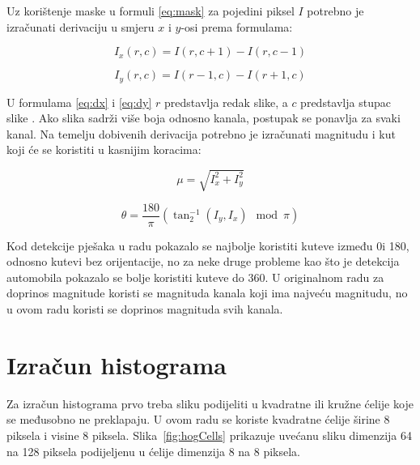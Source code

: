 \documentclass[times, utf8, zavrsni]{fer}
\begin{document}
\begin{equation}
	[-1, 0, 1]
	\label{eq:mask}
\end{equation}

Uz korištenje maske u formuli \ref{eq:mask} za pojedini piksel \(I\) potrebno je izračunati derivaciju u smjeru \(x\) i \(y\)-osi prema formulama:

\begin{equation}
I_x(r, c) = I(r, c + 1) - I(r, c - 1)
\label{eq:dx}
\end{equation}

\begin{equation}
I_y(r, c) = I(r - 1, c) - I(r + 1, c)
\label{eq:dy}
\end{equation}

U formulama \ref{eq:dx} i \ref{eq:dy} \(r\) predstavlja redak slike, a \(c\) predstavlja stupac slike \citep{tomasi2012histograms}. Ako slika sadrži više boja odnosno kanala, postupak se ponavlja za svaki kanal. Na temelju dobivenih derivacija potrebno je izračunati magnitudu i kut koji će se koristiti u kasnijim koracima:

\begin{equation}
\mu = \sqrt{I_x^2 + I_y^2}
\label{eq:mag}
\end{equation}

\begin{equation}
\theta = \frac{180}{\pi}(\tan_2^{-1}(I_y, I_x) \mod \pi)
\label{eq:ang}
\end{equation}

Kod detekcije pješaka u radu \cite{dalal2005histograms} pokazalo se najbolje koristiti kuteve između 0\degree i 180\degree, odnosno kutevi bez orijentacije, no za neke druge probleme kao što je detekcija automobila pokazalo se bolje koristiti kuteve do 360\degree \citep{dalal2005histograms}. U originalnom radu za doprinos magnitude koristi se magnituda kanala koji ima najveću magnitudu, no u ovom radu koristi se doprinos magnituda svih kanala.

\section{Izračun histograma}
Za izračun histograma prvo treba sliku podijeliti u kvadratne ili kružne ćelije koje se međusobno ne preklapaju. U ovom radu se koriste kvadratne ćelije širine 8 piksela i visine 8 piksela. Slika~\ref{fig:hogCells} prikazuje uvećanu sliku dimenzija 64 na 128 piksela podijeljenu u ćelije dimenzija 8 na 8 piksela.
\end{document}
